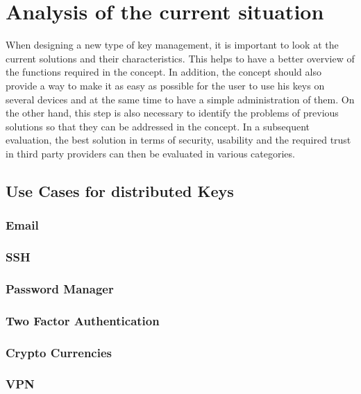 \documentclass[12pt,oneside,a4paper,parskip]{scrbook}
\begin{document}
\chapter{Analysis of the current situation}

When designing a new type of key management, it is important to look at the current solutions and their characteristics. This helps to have a better overview of the functions required in the concept. In addition, the concept should also provide a way to make it as easy as possible for the user to use his keys on several devices and at the same time to have a simple administration of them. On the other hand, this step is also necessary to identify the problems of previous solutions so that they can be addressed in the concept. In a subsequent evaluation, the best solution in terms of security, usability and the required trust in third party providers can then be evaluated in various categories.

\section{Use Cases for distributed Keys}

\subsection{Email}

\subsection{SSH}

\subsection{Password Manager}

\subsection{Two Factor Authentication}

\subsection{Crypto Currencies}

\subsection{VPN}
\end{document}
